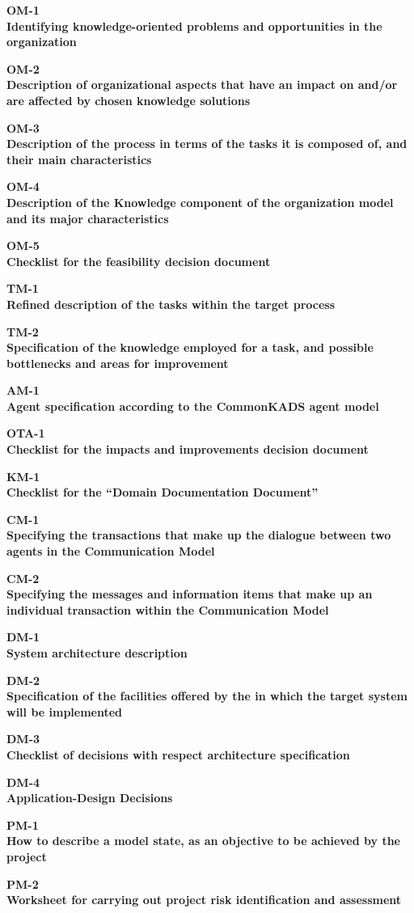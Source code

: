 \documentclass{article}
\begin{document}
\def\worksheet#1#2{%
  \clearpage
  
  \begin{center}
  {\large\bf #1} \\
  {\normalsize\bf #2} \\[12pt]
  \begin{footnotesize}
  
  \end{footnotesize}
  \end{center}  
  \vfill}

\worksheet{OM-1}{Identifying knowledge-oriented problems and
opportunities in the organization}

\worksheet{OM-2}{Description of organizational aspects that
have an impact on and/or are affected by chosen knowledge solutions}

\worksheet{OM-3}{Description of the process in terms of
the tasks it is composed of, and their main characteristics}

\worksheet{OM-4}{Description of the Knowledge component of
the organization model and its major characteristics}

\worksheet{OM-5}{Checklist for the feasibility decision
document}

\worksheet{TM-1}{Refined description of the tasks within the
target process}

\worksheet{TM-2}{Specification of the knowledge employed for a
task, and possible bottlenecks and areas for improvement}

\worksheet{AM-1}{Agent specification according to the
CommonKADS agent model}

\worksheet{OTA-1}{Checklist for the impacts and improvements
decision document}

\worksheet{KM-1}{Checklist for the ``Domain Documentation Document''}

\worksheet{CM-1}{Specifying the transactions that make up the
dialogue between two agents in the Communication Model}

\worksheet{CM-2}{Specifying the messages and information items
that make up an individual transaction within the Communication
Model}

\worksheet{DM-1}{System architecture description}

\worksheet{DM-2}{Specification of the facilities offered by
the in which the target system will be implemented}

\worksheet{DM-3}{Checklist of decisions with respect
architecture specification}

\worksheet{DM-4}{Application-Design Decisions}

\worksheet{PM-1}{How to describe a model state, as an
objective to be achieved by the project}

\worksheet{PM-2}{Worksheet for carrying out project risk
identification and assessment}

  
\end{document}
